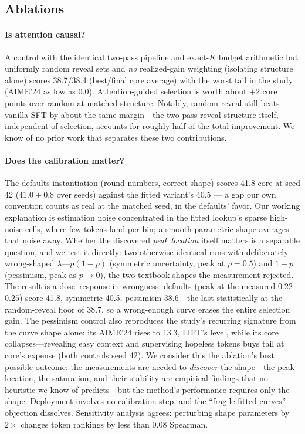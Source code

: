 \documentclass{article} %
\begin{document}
\subsection{Ablations}
\label{sec:ablations}

\paragraph{Is attention causal?} A control with the identical two-pass pipeline and exact-$K$ budget arithmetic but uniformly random reveal sets and \emph{no} realized-gain weighting (isolating structure alone) scores 38.7/38.4 (best/final core average) with the worst tail in the study (AIME'24 as low as 0.0). Attention-guided selection is worth about $+2$ core points over random at matched structure. Notably, random reveal still beats vanilla SFT by about the same margin---the two-pass reveal structure itself, independent of selection, accounts for roughly half of the total improvement. We know of no prior work that separates these two contributions.

\paragraph{Does the calibration matter?} The defaults instantiation (round numbers, correct shape) scores 41.8 core at seed 42 ($41.0 \pm 0.8$ over seeds) against the fitted variant's 40.5 --- a gap our own convention counts as real at the matched seed, in the defaults' favor. Our working explanation is estimation noise concentrated in the fitted lookup's sparse high-noise cells, where few tokens land per bin; a smooth parametric shape averages that noise away. Whether the discovered \emph{peak location} itself matters is a separable question, and we test it directly: two otherwise-identical runs with deliberately wrong-shaped $\lambda$---$p(1{-}p)$ (symmetric uncertainty, peak at $p{=}0.5$) and $1{-}p$ (pessimism, peak as $p \to 0$), the two textbook shapes the measurement rejected. The result is a dose--response in wrongness: defaults (peak at the measured $0.22$--$0.25$) score 41.8, symmetric 40.5, pessimism 38.6---the last statistically at the random-reveal floor of 38.7, so a wrong-enough curve erases the entire selection gain. The pessimism control also reproduces the study's recurring signature from the curve shape alone: its AIME'24 rises to 13.3, LIFT's level, while its core collapses---revealing easy context and supervising hopeless tokens buys tail at core's expense (both controls seed 42). We consider this the ablation's best possible outcome: the measurements are needed to \emph{discover} the shape---the peak location, the saturation, and their stability are empirical findings that no heuristic we know of predicts---but the method's performance requires only the shape. Deployment involves no calibration step, and the ``fragile fitted curves'' objection dissolves. Sensitivity analysis agrees: perturbing shape parameters by $2\times$ changes token rankings by less than $0.08$ Spearman.
\end{document}
